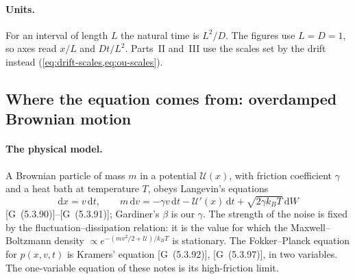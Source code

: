 \documentclass[11pt]{article}
\numberwithin{equation}{section}
\newcommand{\dd}{\mathrm{d}}
\newcommand{\G}[1]{[G~(#1)]}
\begin{document}
\paragraph{Units.} For an interval of length $L$ the natural time is $L^2/D$. The figures use $L=D=1$, so
axes read $x/L$ and $Dt/L^2$. Parts~II and~III use the scales set by the drift instead
(\cref{eq:drift-scales,eq:ou-scales}).

\subsection{Where the equation comes from: overdamped Brownian motion}
\label{sec:physical}

\paragraph{The physical model.} A Brownian particle of mass $m$ in a potential $\mathcal U(x)$, with friction coefficient
$\gamma$ and a heat bath at temperature $T$, obeys Langevin's equations
\begin{equation}
  \dd x=v\,\dd t,\qquad m\,\dd v=-\gamma v\,\dd t-\mathcal U'(x)\,\dd t+\sqrt{2\gamma k_BT}\,\dd W
  \label{eq:langevin}
\end{equation}
\G{5.3.90}--\G{5.3.91}; Gardiner's $\beta$ is our $\gamma$. The strength of the noise is fixed by the
fluctuation--dissipation relation: it is the value for which the Maxwell--Boltzmann density
$\propto e^{-(mv^2/2+\mathcal U)/k_BT}$ is stationary. The Fokker--Planck equation for $p(x,v,t)$ is Kramers' equation
\G{5.3.92}, \G{5.3.97}, in two variables. The one-variable equation of these notes is its high-friction limit.
\end{document}
